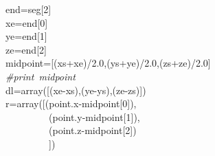 \documentclass{article}
\newcommand{\hlstd}[1]{\textcolor[rgb]{0,0,0}{#1}}
\newcommand{\hlnum}[1]{\textcolor[rgb]{0.16,0.16,1}{#1}}
\newcommand{\hlslc}[1]{\textcolor[rgb]{0.51,0.51,0.51}{\it{#1}}}
\newcommand{\hlsym}[1]{\textcolor[rgb]{0,0,0}{#1}}
\newcommand{\hlkwd}[1]{\textcolor[rgb]{0,0,0.51}{#1}}
\begin{document}
\hlstd{}\hlstd{\ \ \ \ }\hlstd{end}\hlsym{=}\hlstd{seg}\hlsym{{[}}\hlstd{}\hlnum{2}\hlstd{}\hlsym{{]}}\hspace*{\fill}\\
\hlstd{}\hlstd{\ \ \ \ }\hlstd{xe}\hlsym{=}\hlstd{end}\hlsym{{[}}\hlstd{}\hlnum{0}\hlstd{}\hlsym{{]}}\hspace*{\fill}\\
\hlstd{}\hlstd{\ \ \ \ }\hlstd{ye}\hlsym{=}\hlstd{end}\hlsym{{[}}\hlstd{}\hlnum{1}\hlstd{}\hlsym{{]}}\hspace*{\fill}\\
\hlstd{}\hlstd{\ \ \ \ }\hlstd{ze}\hlsym{=}\hlstd{end}\hlsym{{[}}\hlstd{}\hlnum{2}\hlstd{}\hlsym{{]}}\hspace*{\fill}\\
\hlstd{}\hlstd{\ \ \ \ }\hlstd{midpoint}\hlsym{={[}(}\hlstd{xs}\hlsym{+}\hlstd{xe}\hlsym{)/}\hlstd{}\hlnum{2.0}\hlstd{}\hlsym{,(}\hlstd{ys}\hlsym{+}\hlstd{ye}\hlsym{)/}\hlstd{}\hlnum{2.0}\hlstd{}\hlsym{,(}\hlstd{zs}\hlsym{+}\hlstd{ze}\hlsym{)/}\hlstd{}\hlnum{2.0}\hlstd{}\hlsym{{]}}\hspace*{\fill}\\
\hlstd{}\hlstd{\ \ \ \ }\hlstd{}\hlslc{\#print\ midpoint}\hspace*{\fill}\\
\hlstd{}\hlstd{\ \ \ \ }\hlstd{dl}\hlsym{=}\hlstd{}\hlkwd{array}\hlstd{}\hlsym{({[}(}\hlstd{xe}\hlsym{{-}}\hlstd{xs}\hlsym{),(}\hlstd{ye}\hlsym{{-}}\hlstd{ys}\hlsym{),(}\hlstd{ze}\hlsym{{-}}\hlstd{zs}\hlsym{){]})}\hspace*{\fill}\\
\hlstd{}\hlstd{\ \ \ \ }\hlstd{r}\hlsym{=}\hlstd{}\hlkwd{array}\hlstd{}\hlsym{({[}(}\hlstd{point}\hlsym{.}\hlstd{x}\hlsym{{-}}\hlstd{midpoint}\hlsym{{[}}\hlstd{}\hlnum{0}\hlstd{}\hlsym{{]}),}\hspace*{\fill}\\
\hlstd{}\hlstd{\ \ \ \ \ \ \ \ \ \ \ \ \ }\hlstd{}\hlsym{(}\hlstd{point}\hlsym{.}\hlstd{y}\hlsym{{-}}\hlstd{midpoint}\hlsym{{[}}\hlstd{}\hlnum{1}\hlstd{}\hlsym{{]}),}\hspace*{\fill}\\
\hlstd{}\hlstd{\ \ \ \ \ \ \ \ \ \ \ \ \ }\hlstd{}\hlsym{(}\hlstd{point}\hlsym{.}\hlstd{z}\hlsym{{-}}\hlstd{midpoint}\hlsym{{[}}\hlstd{}\hlnum{2}\hlstd{}\hlsym{{]})}\hspace*{\fill}\\
\hlstd{}\hlstd{\ \ \ \ \ \ \ \ \ \ \ \ \ }\hlstd{}\hlsym{{]})}\hspace*{\fill}\\
\end{document}

